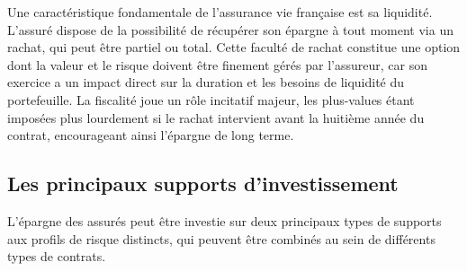 \bigskip

Une caractéristique fondamentale de l'assurance vie française est sa liquidité. L'assuré dispose de la possibilité de récupérer son épargne à tout moment via un rachat, qui peut être partiel ou total. Cette faculté de rachat constitue une option dont la valeur et le risque doivent être finement gérés par l'assureur, car son exercice a un impact direct sur la duration et les besoins de liquidité du portefeuille. La fiscalité joue un rôle incitatif majeur, les plus-values étant imposées plus lourdement si le rachat intervient avant la huitième année du contrat, encourageant ainsi l'épargne de long terme.

\subsection{Les principaux supports d'investissement}

L'épargne des assurés peut être investie sur deux principaux types de supports aux profils de risque distincts, qui peuvent être combinés au sein de différents types de contrats.

\bigskip



